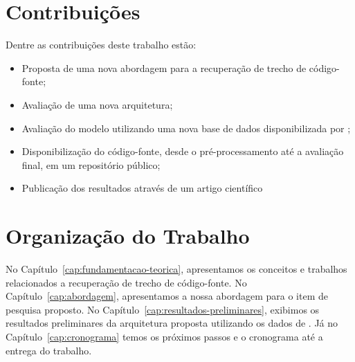 \section{Contribuições}
\label{sec:contribucoes}

Dentre as contribuições deste trabalho estão:

\begin{itemize}
\item Proposta de uma nova abordagem para a recuperação de trecho de código-fonte;
\item Avaliação de uma nova arquitetura;
\item Avaliação do modelo utilizando uma nova base de dados disponibilizada por \cite{yao-2018};
\item Disponibilização do código-fonte, desde o pré-processamento até a avaliação final, em um repositório público;
\item Publicação dos resultados através de um artigo científico
\end{itemize}

\section{Organização do Trabalho}
\label{sec:organizacao_trabalho}

No Capítulo~\ref{cap:fundamentacao-teorica}, apresentamos os conceitos e trabalhos relacionados a recuperação de trecho de código-fonte. No Capítulo~\ref{cap:abordagem}, apresentamos a nossa abordagem para o item de pesquisa proposto. No Capítulo~\ref{cap:resultados-preliminares}, exibimos os resultados preliminares da arquitetura proposta utilizando os dados de \cite{yao-2018}. Já no Capítulo~\ref{cap:cronograma} temos os próximos passos e o cronograma até a entrega do trabalho.